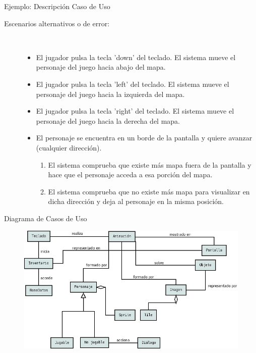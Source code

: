 \documentclass[9pt,xcolor=svgnames]{beamer}
\begin{document}
  
  \begin{frame}{Ejemplo: Descripción Caso de Uso}

   \begin{description}    
    \item[Escenarios alternativos o de error:] $\quad$	       
	       \begin{itemize}
		\item El jugador pulsa la tecla 'down' del teclado.
		      El sistema mueve el personaje del juego hacia
		      abajo del mapa.
		\item El jugador pulsa la tecla 'left' del teclado.
		      El sistema mueve el personaje del juego
		      hacia la izquierda del mapa.
		\item El jugador pulsa la tecla 'right' del teclado.
		      El sistema mueve el personaje del juego
		      hacia la derecha del mapa.
		\item El personaje se encuentra en un borde de la
		      pantalla y quiere avanzar (cualquier dirección).
		      \begin{enumerate}
		       \item El sistema comprueba que existe más mapa
			     fuera de la pantalla y hace que el
			     personaje acceda a esa porción del mapa.
		       \item El sistema comprueba que no existe más mapa
			     para visualizar en dicha dirección y deja
			     al personaje en la misma posición.
		      \end{enumerate}
	       \end{itemize}
   \end{description} 
  \end{frame}
  
  
  \begin{frame}{Diagrama de Casos de Uso}
   \begin{figure}[t]
    \includegraphics[scale=0.34]{./Imagenes/Diagrama_conceptual.png}
   \end{figure}
  \end{frame}
  
\end{document}
